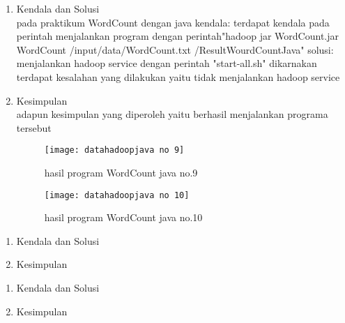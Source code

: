 \begin{enumerate}
\item Kendala dan Solusi\\
pada praktikum WordCount dengan java 
kendala:
terdapat kendala pada perintah menjalankan program dengan perintah"hadoop jar WordCount.jar WordCount /input/data/WordCount.txt /ResultWourdCountJava"
solusi:
menjalankan hadoop service dengan perintah "start-all.sh" dikarnakan terdapat kesalahan yang dilakukan yaitu tidak menjalankan hadoop service

\item Kesimpulan\\
adapun kesimpulan yang diperoleh yaitu berhasil menjalankan programa tersebut 

\begin{figure}[!ht]
\texttt{[image: datahadoopjava no 9]}
\caption{hasil program WordCount java no.9}
\label{gam:hasil program}
\end{figure}

\begin{figure}[!ht]
\texttt{[image: datahadoopjava no 10]}
\caption{hasil program WordCount java no.10}
\label{gam:hasil program}
\end{figure}

\end{enumerate}

\begin{enumerate}
\item Kendala dan Solusi

\item Kesimpulan

\end{enumerate}

\begin{enumerate}
\item Kendala dan Solusi

\item Kesimpulan

\end{enumerate}